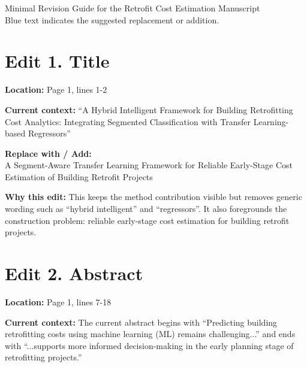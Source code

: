 \documentclass[11pt]{article}
\newcommand{\loc}[1]{\textbf{Location:} #1}
\newcommand{\current}[1]{\textbf{Current context:} #1}
\newcommand{\replacewith}[1]{\textbf{Replace with / Add:}\\{\color{blue}#1}}
\newcommand{\why}[1]{\textbf{Why this edit:} #1}
\begin{document}
\begin{center}
{\Large Minimal Revision Guide for the Retrofit Cost Estimation Manuscript}\\
{\small Blue text indicates the suggested replacement or addition.}
\end{center}

\section*{Edit 1. Title}
\loc{Page 1, lines 1-2}

\current{``A Hybrid Intelligent Framework for Building Retrofitting Cost Analytics: Integrating Segmented Classification with Transfer Learning-based Regressors''}

\replacewith{A Segment-Aware Transfer Learning Framework for Reliable Early-Stage Cost Estimation of Building Retrofit Projects}

\why{This keeps the method contribution visible but removes generic wording such as ``hybrid intelligent'' and ``regressors''. It also foregrounds the construction problem: reliable early-stage cost estimation for building retrofit projects.}

\section*{Edit 2. Abstract}
\loc{Page 1, lines 7-18}

\current{The current abstract begins with ``Predicting building retrofitting costs using machine learning (ML) remains challenging...'' and ends with ``...supports more informed decision-making in the early planning stage of retrofitting projects.''}
\end{document}
